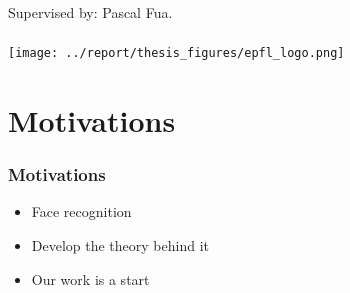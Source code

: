 \documentclass[10pt]{beamer}
\author{\docauthor}
\title{\doctitle}
\begin{document}
\begin{frame}
    \titlepage
    \begin{center}
        Supervised by: Pascal Fua.
        \\
        \vspace{0.5cm}
        \\
        \texttt{[image: ../report/thesis\_figures/epfl\_logo.png]}
    \end{center}
\end{frame}


\begin{frame}
    \tableofcontents{}
\end{frame}

\section{Motivations}
\begin{frame}
    \frametitle{Motivations}
    \begin{itemize}
        \item Face recognition
        \item Develop the theory behind it
        \item Our work is a start
    \end{itemize}

\end{frame}
\end{document}
